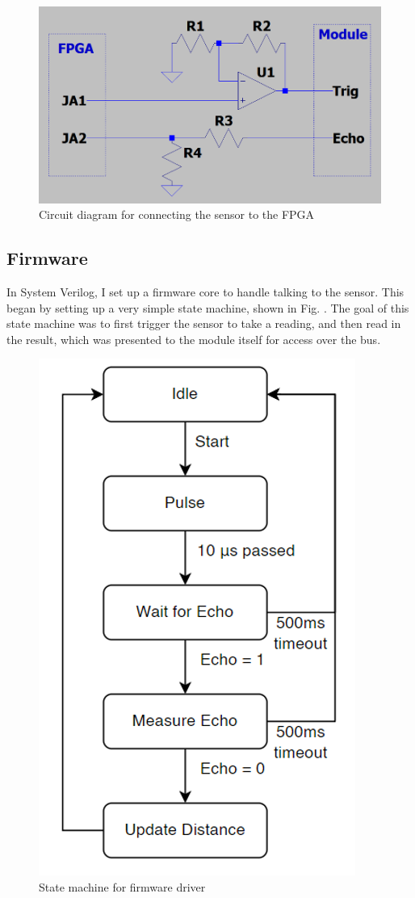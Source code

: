 \documentclass{article}
\begin{document}
	 \begin{figure}[H]
		\centering
		\includegraphics[width=.6\linewidth]{circuit}
		\caption{Circuit diagram for connecting the sensor to the FPGA}
		\label{fig:circuit}
	\end{figure}
	
	\subsection*{Firmware}
	
	In System Verilog, I set up a firmware core to handle talking to the sensor. This began by setting up a very simple state machine, shown in Fig. \label{states}. The goal of this state machine was to first trigger the sensor to take a reading, and then read in the result, which was presented to the module itself for access over the bus. 
	
	\begin{figure} [H]
		\centering
		\includegraphics[width=.6\linewidth]{stateMachine}
		\caption{State machine for firmware driver}
		\label{fig:states}
	\end{figure}
	
\end{document}
